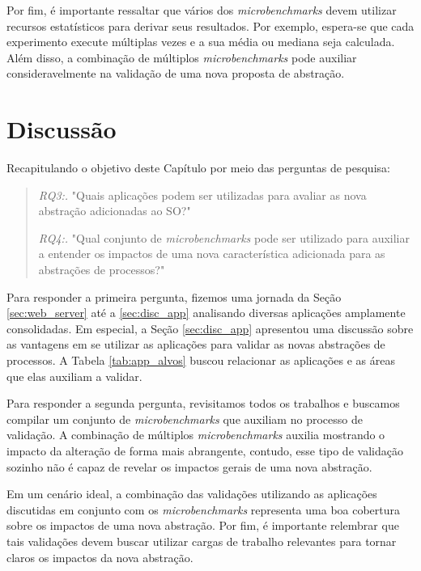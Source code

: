 Por fim, é importante ressaltar que vários dos \textit{microbenchmarks} devem
utilizar recursos estatísticos para derivar seus resultados. Por exemplo,
espera-se que cada experimento execute múltiplas vezes e a sua média ou mediana
seja calculada. Além disso, a combinação de múltiplos \textit{microbenchmarks}
pode auxiliar consideravelmente na validação de uma nova proposta de abstração.

\section{Discussão}

Recapitulando o objetivo deste Capítulo por meio das perguntas de pesquisa:

\begin{quote}
 \item \textit{RQ3:.} "Quais aplicações podem ser utilizadas para avaliar as nova abstração adicionadas ao SO?"
 \item \textit{RQ4:.} "Qual conjunto de \emph{microbenchmarks} pode ser utilizado para auxiliar a entender os impactos de uma nova característica adicionada para as abstrações de processos?"
\end{quote}

Para responder a primeira pergunta, fizemos uma jornada da Seção
\ref{sec:web_server} até a \ref{sec:disc_app} analisando diversas aplicações
amplamente consolidadas. Em especial, a Seção \ref{sec:disc_app} apresentou uma
discussão sobre as vantagens em se utilizar as aplicações para validar as novas
abstrações de processos. A Tabela \ref{tab:app_alvos} buscou relacionar as
aplicações e as áreas que elas auxiliam a validar.

Para responder a segunda pergunta, revisitamos todos os trabalhos e buscamos
compilar um conjunto de \textit{microbenchmarks} que auxiliam no processo de
validação.  A combinação de múltiplos \textit{microbenchmarks} auxilia
mostrando o impacto da alteração de forma mais abrangente, contudo, esse tipo
de validação sozinho não é capaz de revelar os impactos gerais de uma nova
abstração.

Em um cenário ideal, a combinação das validações utilizando as aplicações
discutidas em conjunto com os \textit{microbenchmarks} representa uma boa
cobertura sobre os impactos de uma nova abstração. Por fim, é importante
relembrar que tais validações devem buscar utilizar cargas de trabalho
relevantes para tornar claros os impactos da nova abstração.

